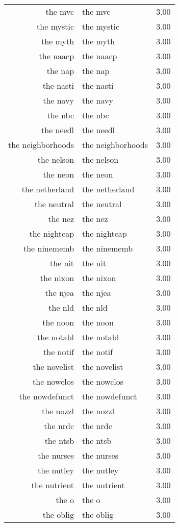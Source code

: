 \begin{table}[ht]
\begin{tabular}{rlr}
  the mvc & the mvc & 3.00 \\ 
  the mystic & the mystic & 3.00 \\ 
  the myth & the myth & 3.00 \\ 
  the naacp & the naacp & 3.00 \\ 
  the nap & the nap & 3.00 \\ 
  the nasti & the nasti & 3.00 \\ 
  the navy & the navy & 3.00 \\ 
  the nbc & the nbc & 3.00 \\ 
  the needl & the needl & 3.00 \\ 
  the neighborhoods & the neighborhoods & 3.00 \\ 
  the nelson & the nelson & 3.00 \\ 
  the neon & the neon & 3.00 \\ 
  the netherland & the netherland & 3.00 \\ 
  the neutral & the neutral & 3.00 \\ 
  the nez & the nez & 3.00 \\ 
  the nightcap & the nightcap & 3.00 \\ 
  the ninememb & the ninememb & 3.00 \\ 
  the nit & the nit & 3.00 \\ 
  the nixon & the nixon & 3.00 \\ 
  the njea & the njea & 3.00 \\ 
  the nld & the nld & 3.00 \\ 
  the noon & the noon & 3.00 \\ 
  the notabl & the notabl & 3.00 \\ 
  the notif & the notif & 3.00 \\ 
  the novelist & the novelist & 3.00 \\ 
  the nowclos & the nowclos & 3.00 \\ 
  the nowdefunct & the nowdefunct & 3.00 \\ 
  the nozzl & the nozzl & 3.00 \\ 
  the nrdc & the nrdc & 3.00 \\ 
  the ntsb & the ntsb & 3.00 \\ 
  the nurses & the nurses & 3.00 \\ 
  the nutley & the nutley & 3.00 \\ 
  the nutrient & the nutrient & 3.00 \\ 
  the o & the o & 3.00 \\ 
  the oblig & the oblig & 3.00 \\ 

\end{tabular}
\end{table}
